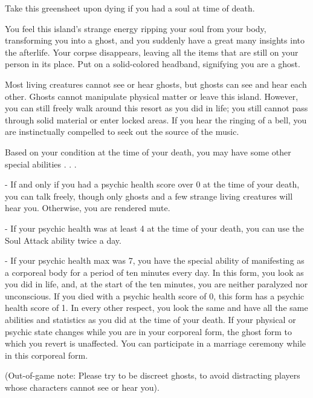 \documentclass[green]{Kos}
\begin{document}
\name{\gGhost{}}

Take this greensheet upon dying if you had a soul at time of death.

You feel this island's strange energy ripping your soul from your body, transforming you into a ghost, and you suddenly have a great many insights into the afterlife. Your corpse disappears, leaving all the items that are still on your person in its place. Put on a solid-colored headband, signifying you are a ghost.

Most living creatures cannot see or hear ghosts, but ghosts can see and hear each other. Ghosts cannot manipulate physical matter or leave this island. However, you can still freely walk around this resort as you did in life; you still cannot pass through solid material or enter locked areas. If you hear the ringing of a bell, you are instinctually compelled to seek out the source of the music. 

Based on your condition at the time of your death, you may have some other special abilities . . . 

- If and only if you had a psychic health score over 0 at the time of your death, you can talk freely, though only ghosts and a few strange living creatures will hear you. Otherwise, you are rendered mute.

- If your psychic health was at least 4 at the time of your death, you can use the Soul Attack ability twice a day. 

- If your psychic health max was 7, you have the special ability of manifesting as a corporeal body for a period of ten minutes every day. In this form, you look as you did in life, and, at the start of the ten minutes, you are neither paralyzed nor unconscious. If you died with a psychic health score of 0, this form has a psychic health score of 1. In every other respect, you look the same and have all the same abilities and statistics as you did at the time of your death. If your physical or psychic state changes while you are in your corporeal form, the ghost form to which you revert is unaffected. You can participate in a marriage ceremony while in this corporeal form.

(Out-of-game note: Please try to be discreet ghosts, to avoid distracting players whose characters cannot see or hear you).
\end{document}
